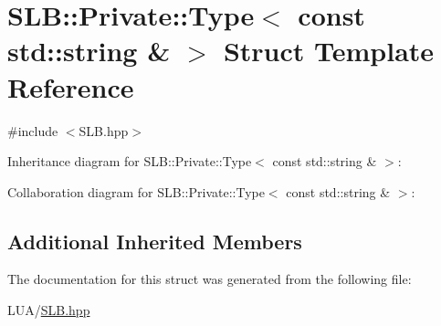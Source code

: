 \hypertarget{structSLB_1_1Private_1_1Type_3_01const_01std_1_1string_01_6_01_4}{}\section{S\+LB\+:\+:Private\+:\+:Type$<$ const std\+:\+:string \& $>$ Struct Template Reference}
\label{structSLB_1_1Private_1_1Type_3_01const_01std_1_1string_01_6_01_4}


{\ttfamily \#include $<$S\+L\+B.\+hpp$>$}



Inheritance diagram for S\+LB\+:\+:Private\+:\+:Type$<$ const std\+:\+:string \& $>$\+:


Collaboration diagram for S\+LB\+:\+:Private\+:\+:Type$<$ const std\+:\+:string \& $>$\+:
\subsection*{Additional Inherited Members}


The documentation for this struct was generated from the following file\+:\begin{DoxyCompactItemize}
\item 
L\+U\+A/\hyperlink{SLB_8hpp}{S\+L\+B.\+hpp}\end{DoxyCompactItemize}
